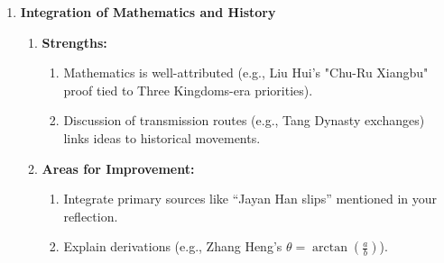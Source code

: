 \documentclass{article}
\begin{document}
\begin{enumerate}
    \item \textbf{Integration of Mathematics and History}
    \begin{enumerate}
        \item \textbf{Strengths:}
        \begin{enumerate}
            \item Mathematics is well-attributed (e.g., Liu Hui’s "Chu-Ru Xiangbu" proof tied to Three Kingdoms-era priorities).
            \item Discussion of transmission routes (e.g., Tang Dynasty exchanges) links ideas to historical movements.
        \end{enumerate}
        
        \item \textbf{Areas for Improvement:}
        \begin{enumerate}
            \item Integrate primary sources like “Jayan Han slips” mentioned in your reflection.
            \item Explain derivations (e.g., Zhang Heng’s $\theta = \arctan\left(\frac{a}{b}\right)$).
        \end{enumerate}
    \end{enumerate}
    
\end{enumerate}
\end{document}
